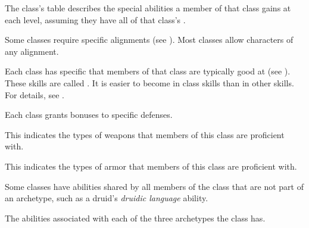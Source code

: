         The class's table describes the special abilities a member of that class gains at each level, assuming they have all of that class's .

        Some classes require specific alignments (see ).
        Most classes allow characters of any alignment.

        Each class has specific  that members of that class are typically good at (see ).
        These skills are called .
        It is easier to become  in class skills than in other skills.
        For details, see .

        Each class grants bonuses to specific defenses.

        This indicates the types of weapons that members of this class are proficient with.

        This indicates the types of armor that members of this class are proficient with.

        Some classes have abilities shared by all members of the class that are not part of an archetype, such as a druid's \textit{druidic language} ability.

        The abilities associated with each of the three archetypes the class has.

\newpage
